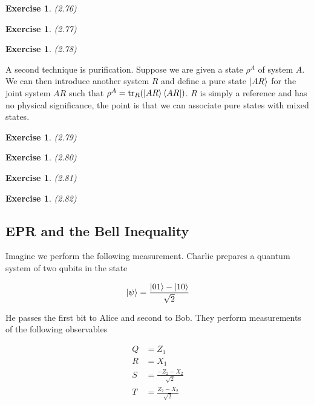 \documentclass[11pt]{article}
\newcommand\0{\mathbf{0}}
\newcommand\<{\langle}
\renewcommand\>{\rangle}
\newtheorem{exercise}[theorem]{Exercise}
\begin{document}
\begin{exercise}(2.76)
\end{exercise}

\begin{exercise}(2.77)
\end{exercise}

\begin{exercise}(2.78)
\end{exercise}

A second technique is purification. Suppose we are given a state $\rho^A$ of system $A$. We can then introduce another system $R$ and define a pure state $\ket{AR}$ for the joint system $AR$ such that $\rho^A = \tr_R (\ket{AR}\bra{AR})$. $R$ is simply a reference and has no physical significance, the point is that we can associate pure states with mixed states.

\begin{exercise}(2.79)
\end{exercise}

\begin{exercise}(2.80)
\end{exercise}

\begin{exercise}(2.81)
\end{exercise}

\begin{exercise}(2.82)
\end{exercise}

\subsection{EPR and the Bell Inequality}  

Imagine we perform the following measurement. Charlie prepares a quantum system of two qubits in the state

\begin{align*}
\ket{\psi} = \frac{\ket{01} - \ket{10}}{\sqrt{2}}	
\end{align*}

He passes the first bit to Alice and second to Bob. They perform measurements of the following observables

\begin{align*}
Q &= Z_1 \\
R &= X_1 \\
S &= \frac{-Z_2-X_2}{\sqrt{2}} \\
T &= \frac{Z_2 - X_2}{\sqrt{2}}	
\end{align*}
\end{document}
